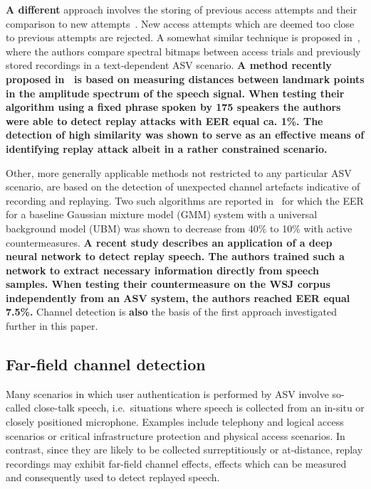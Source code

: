 {\bfseries A different} approach involves the storing of previous access attempts and their comparison to new attempts~\cite{Shang2010}.
New access attempts which are deemed too close to previous attempts are rejected.
A somewhat similar technique is proposed in~\cite{Wu2014}, where the authors compare spectral bitmaps between access trials and previously stored recordings in a text-dependent ASV scenario. {\bfseries A method recently proposed in~\cite{Galka2015} is based on measuring distances between landmark points in the amplitude spectrum of the speech signal. When testing their algorithm using a fixed phrase spoken by 175 speakers the authors were able to detect replay attacks with EER equal ca. 1\%.
The detection of high similarity was shown to serve as an effective means of identifying replay attack albeit in a rather constrained scenario. } %



Other, more generally applicable methods not restricted to any particular ASV scenario, are based on the detection of unexpected channel artefacts indicative of recording and replaying.
Two such algorithms are reported in~\cite{Wang2011} for which the EER for a baseline Gaussian mixture model (GMM) system with a universal background model (UBM) was shown to decrease from 40\% to 10\% with active countermeasures.  {\bfseries A recent study \cite{Luo2015} describes an application of a deep neural network to detect replay speech. The authors trained such a network to extract necessary information directly from speech samples. When testing their countermeasure on the WSJ corpus independently from an ASV system, the authors reached EER equal 7.5\%.} Channel detection is {\bfseries also} the basis of the first approach investigated further in this paper.




\subsection{Far-field channel detection}
\label{subsec:ffd}

Many scenarios in which user authentication is performed by ASV involve so-called close-talk speech, i.e.\ situations where speech is collected from an in-situ or closely positioned microphone.  Examples include telephony and logical access scenarios or critical infrastructure protection and physical access scenarios.  In contrast, since they are likely to be collected surreptitiously or at-distance, replay recordings may exhibit far-field channel effects, effects which can be measured and consequently used to detect replayed speech.  

